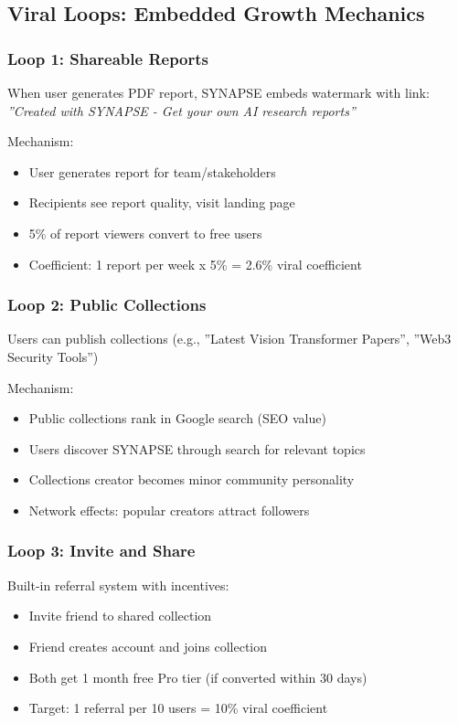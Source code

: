 \documentclass{report}
\begin{document}
\subsection{Viral Loops: Embedded Growth Mechanics}

\subsubsection{Loop 1: Shareable Reports}

When user generates PDF report, SYNAPSE embeds watermark with link: \textit{''Created with SYNAPSE - Get your own AI research reports''}

Mechanism:
\begin{itemize}
    \item User generates report for team/stakeholders
    \item Recipients see report quality, visit landing page
    \item 5\% of report viewers convert to free users
    \item Coefficient: 1 report per week x 5\% = 2.6\% viral coefficient
\end{itemize}

\subsubsection{Loop 2: Public Collections}

Users can publish collections (e.g., ''Latest Vision Transformer Papers'', ''Web3 Security Tools'')

Mechanism:
\begin{itemize}
    \item Public collections rank in Google search (SEO value)
    \item Users discover SYNAPSE through search for relevant topics
    \item Collections creator becomes minor community personality
    \item Network effects: popular creators attract followers
\end{itemize}

\subsubsection{Loop 3: Invite and Share}

Built-in referral system with incentives:

\begin{itemize}
    \item Invite friend to shared collection
    \item Friend creates account and joins collection
    \item Both get 1 month free Pro tier (if converted within 30 days)
    \item Target: 1 referral per 10 users = 10\% viral coefficient
\end{itemize}
\end{document}
